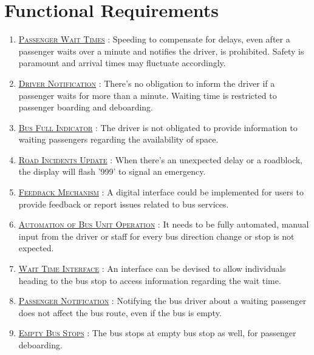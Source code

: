 \section{Functional Requirements}

\begin{enumerate}
    \item \underline{\textsc{Passenger Wait Times}} : Speeding to compensate for delays, even after a passenger waits over a minute and notifies the driver, is prohibited. Safety is paramount and arrival times may fluctuate accordingly.

    \item \underline{\textsc{Driver Notification}} : There's no obligation to inform the driver if a passenger waits for more than a minute. Waiting time is restricted to passenger boarding and deboarding.

    \item \underline{\textsc{Bus Full Indicator}} : The driver is not obligated to provide information to waiting passengers regarding the availability of space.

    \item \underline{\textsc{Road Incidents Update}} : When there's an unexpected delay or a roadblock, the display will flash '999' to signal an emergency.

    \item {}\underline{\textsc{Feedback Mechanism}} : A digital interface could be implemented for users to provide feedback or report issues related to bus services.

    \item {}\underline{\textsc{Automation of Bus Unit Operation}} :  It needs to be fully automated, manual input from the driver or staff for every bus direction change or stop is not expected.

    \item \underline{\textsc{Wait Time Interface}} : An interface can be devised to allow individuals heading to the bus stop to access information regarding the wait time.

    \item \underline{\textsc{Passenger Notification}} : Notifying the bus driver about a waiting passenger does not affect the bus route, even if the bus is empty.

    \item \underline{\textsc{Empty Bus Stops}} : The bus stops at empty bus stop as well, for passenger deboarding.


\end{enumerate}
